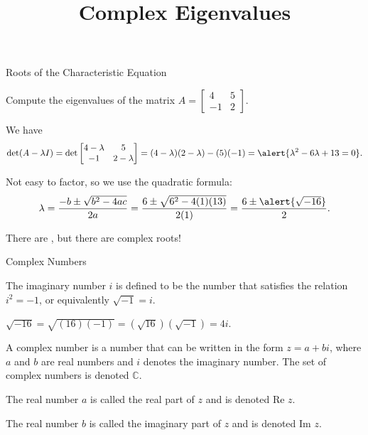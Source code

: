\documentclass[xcolor=dvipsnames,aspectratio=169,t]{beamer}
\title{Complex Eigenvalues}
\renewcommand{\Re}{\ensuremath{\text{Re }}}
\renewcommand{\Im}{\ensuremath{\text{Im }}}
\begin{document}
\maketitle

\begin{frame}{Roots of the Characteristic Equation}
  \begin{example}
  Compute the eigenvalues of the matrix $A = \begin{bmatrix} 4 & 5 \\ -1 & 2 \end{bmatrix}$.
  \end{example}

  \pause
  We have
  \[ \det (A - \lambda I) = \det \begin{bmatrix} 4-\lambda & 5 \\ -1 & 2 - \lambda \end{bmatrix} = (4-\lambda)(2-\lambda) - (5)(-1) = \alert{\lambda^2 - 6 \lambda + 13 = 0}. \]

  \pause
  Not easy to factor, so we use the \alert{quadratic formula}:
  \[ \lambda = \frac{-b \pm \sqrt{b^2 -4ac}}{2a} = \frac{6 \pm \sqrt{6^2-4(1)(13)}}{2(1)} = \frac{6 \pm \alert{\sqrt{-16}}}{2}.\]
  \vspace*{-.5em}

  There are , but there are \alert{complex roots}!
\end{frame}

\begin{frame}{Complex Numbers}
  \begin{definition}
  The \alert{imaginary number $i$} is defined to be the number that satisfies the relation $i^2 = -1$, or equivalently $\sqrt{-1} = i$.
  \end{definition}
  \bigskip

  $\sqrt{-16} = \sqrt{(16)(-1)}  = (\sqrt{16})( \sqrt{-1}) = 4i$.
  \bigskip

  \pause
  \begin{definition}
  A \alert{complex number} is a number that can be written in the form $z=a+bi$, where $a$ and $b$ are real numbers and $i$ denotes the imaginary number.
  The set of complex numbers is denoted \alert{$\mathbb{C}$}.
  \bi
  \item The real number $a$ is called the \alert{real part} of $z$ and is denoted \alert{$\Re z$}.
  \item The real number $b$ is called the \alert{imaginary part} of $z$ and is denoted \alert{$\Im z$}.
  \ei
  \end{definition}
\end{frame}
\end{document}
